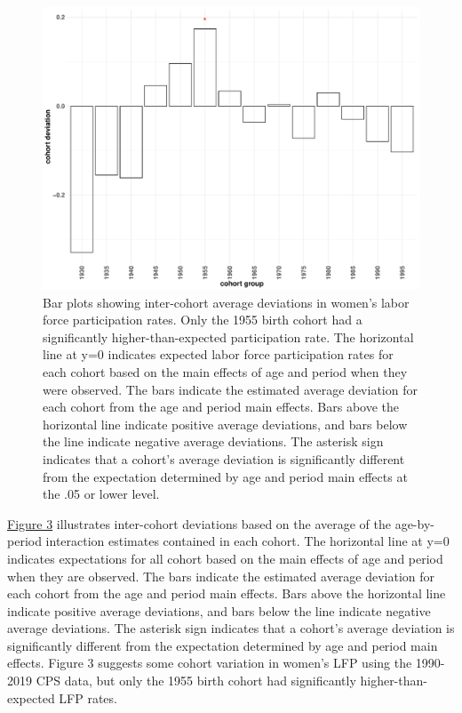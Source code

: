 \begin{figure}[htbp]
  \centering
  \includegraphics[width=0.8\linewidth]{figure3.pdf}
  \caption{Bar plots showing inter-cohort average deviations in women's labor force participation rates. Only the 1955 birth cohort had a significantly higher-than-expected participation rate. The horizontal line at y=0 indicates expected labor force participation rates for each cohort based on the main effects of age and period when they were observed. The bars indicate the estimated average deviation for each cohort from the age and period main effects. Bars above the horizontal line indicate positive average deviations, and bars below the line indicate negative average deviations. The asterisk sign indicates that a cohort's average deviation is significantly different from the expectation determined by age and period main effects at the .05 or lower level.}
  \label{figure:3}
\end{figure}

\hyperref[figure:3]{Figure 3} illustrates inter-cohort deviations based on the average of the age-by-period interaction estimates contained in each cohort. The horizontal line at y=0 indicates expectations for all cohort based on the main effects of age and period when they are observed. The bars indicate the estimated average deviation for each cohort from the age and period main effects. Bars above the horizontal line indicate positive average deviations, and bars below the line indicate negative average deviations. The asterisk sign indicates that a cohort's average deviation is significantly different from the expectation determined by age and period main effects. Figure 3 suggests some cohort variation in women's LFP using the 1990-2019 CPS data, but only the 1955 birth cohort had significantly higher-than-expected LFP rates. 



